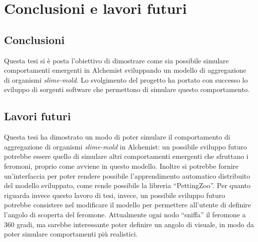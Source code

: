 \chapter{Conclusioni e lavori futuri}
\section{Conclusioni}
Questa tesi si è posta l'obiettivo di dimostrare come sia possibile simulare comportamenti emergenti in Alchemist sviluppando un modello
di aggregazione di organismi \textit{slime-mold}. 
Lo svolgimento del progetto ha portato con successo lo sviluppo di sorgenti software che permettono di simulare
questo comportamento.
\section{Lavori futuri}
Questa tesi ha dimostrato un modo di poter simulare il comportamento di aggregazione di organismi \textit{slime-mold} in Alchemist:
un possibile sviluppo futuro potrebbe essere quello di simulare altri comportamenti emergenti che sfruttano
i feromoni, proprio come avviene in questo modello.\newline
Inoltre si potrebbe fornire un'interfaccia per poter 
rendere possibile l'apprendimento automatico distribuito del modello sviluppato, come rende possibile la libreria ``PettingZoo''\cite{terry2021pettingzoo}.
Per quanto riguarda invece questo lavoro di tesi, invece, un possibile sviluppo futuro potrebbe consistere nel modificare il modello per permettere all'utente di definire l'angolo di 
scoperta del feromone. Attualmente ogni nodo ``sniffa'' il feromone a 360 gradi, ma sarebbe interessante
poter definire un angolo di visuale, in modo da poter simulare comportamenti più realistici.